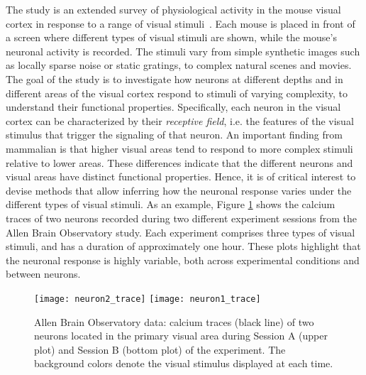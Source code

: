 The study is an extended survey of physiological activity in the mouse visual cortex in response to a range of visual stimuli~\citep{allen_stimulus}. Each mouse is placed in front of a screen where different types of visual stimuli are shown, while the mouse’s neuronal activity is recorded. The stimuli vary from simple synthetic images such as locally sparse noise or static gratings, to complex natural scenes and movies.
The goal of the study is to investigate how neurons at different depths and in different areas of the visual cortex respond to stimuli of varying complexity, to understand their functional properties. Specifically, each neuron in the visual cortex can be characterized by their \textit{receptive field}, i.e. the features of the visual stimulus that trigger the signaling of that neuron. 
An important finding from mammalian is that higher visual areas tend to respond to more complex stimuli relative to lower areas. These differences indicate that the different neurons and visual areas have distinct functional properties.
Hence, it is of critical interest to devise methods that allow inferring how the neuronal response varies under the different types of visual stimuli. %
As an example, Figure \ref{fig:ch1_trace_neurons} shows the calcium traces of two neurons recorded during two different experiment sessions from the Allen Brain Observatory study.
Each experiment comprises three types of visual stimuli, and has a duration of approximately one hour.
These plots highlight that the neuronal response is highly variable, both across experimental conditions and between neurons.

\begin{figure}
	\centering
	\texttt{[image: neuron2\_trace]}
	\centering
	\texttt{[image: neuron1\_trace]}
	\caption[Allen Brain Observatory data: calcium traces of two neurons located in the primary visual area during Session A and Session B of the experiment. ]{Allen Brain Observatory data: calcium traces (black line) of two neurons located in the primary visual area during Session A (upper plot) and Session B (bottom plot) of the experiment. The background colors denote the visual stimulus displayed at each time.}\label{fig:ch1_trace_neurons}
\end{figure}


